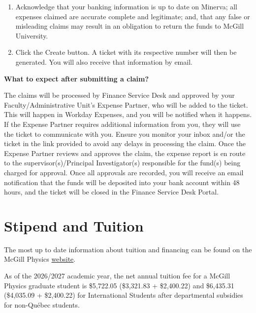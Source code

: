 \begin{enumerate}[leftmargin=10pt]
        \item Acknowledge that your banking information is up to date on Minerva; all expenses claimed are accurate complete and legitimate; and, that any false or misleading claims may result in an obligation to return the funds to McGill University.\\

        \item Click the Create button. A ticket with its respective number will then be generated. You will also receive that information by email.\\
        
     \end{enumerate}

  
    
    \noindent \textbf{\sffamily What to expect after submitting a claim?}
    
    The claims will be processed by Finance Service Desk and approved by your Faculty/Administrative Unit’s Expense Partner, who will be added to the ticket. This will happen in Workday Expenses, and you will be notified when it happens. If the Expense Partner requires additional information from you, they will use the ticket to communicate with you. Ensure you monitor your inbox and/or the ticket in the link provided to avoid any delays in processing the claim. Once the Expense Partner reviews and approves the claim, the expense report is en route to the supervisor(s)/Principal Investigator(s) responsible for the fund(s) being charged for approval. Once all approvals are recorded, you will receive an email notification that the funds will be deposited into your bank account within 48 hours, and the ticket will be closed in the Finance Service Desk Portal.
    
    

\section{Stipend and Tuition}  
The most up to date information about tuition and financing can be found on the McGill Physics \href{https://www.physics.mcgill.ca/grads/finance.html}{website}.

As of the 2026/2027 academic year, the net annual tuition fee for a McGill Physics graduate student is {\color{ocre}\$5,722.05} (\$3,321.83 + \$2,400.22) and {\color{ocre} \$6,435.31} (\$4,035.09 + \$2,400.22) for International Students after departmental subsidies for non-Québec students.

